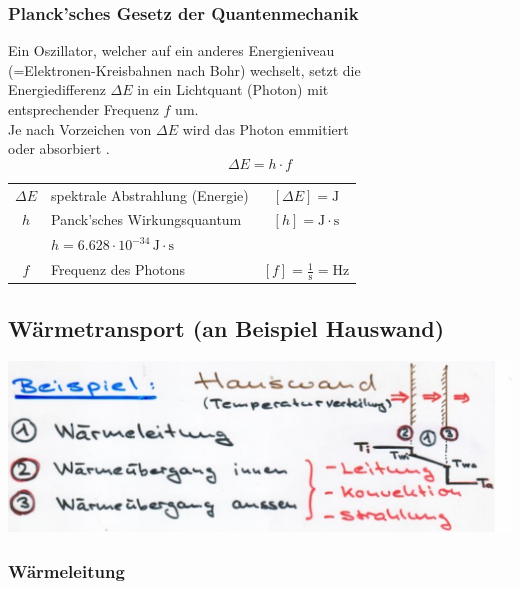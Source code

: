 \subsubsection{Planck'sches Gesetz der Quantenmechanik}

Ein Oszillator, welcher auf ein anderes Energieniveau  \\
(=Elektronen-Kreisbahnen nach Bohr) wechselt, setzt die \\
Energiedifferenz $\Delta E$ in ein Lichtquant (Photon) mit \\
entsprechender Frequenz $f$ um. \\
Je nach Vorzeichen von $\Delta E$ wird das Photon emmitiert  \\
oder absorbiert . \\

$$ \boxed { \Delta E = h \cdot f }  $$

\begin{tabular}{c l c}
	$\Delta E$ & spektrale Abstrahlung (Energie) & $[\Delta E] = \mathrm{J}$ \\
	$h$ & Panck'sches Wirkungsquantum & $[h] = \mathrm{J \cdot s} $\\
	&  $h = 6.628 \cdot 10^{-34} \, \mathrm{J \cdot s}$ &  \\
	\rule{0pt}{8pt}$f$ & Frequenz des Photons & $ [f] = \mathrm{\frac{1}{s} = Hz}$ \\
\end{tabular}



\vfill\null
\columnbreak


\subsection{Wärmetransport (an Beispiel Hauswand)}


\includegraphics[width=0.9\linewidth]{Bilder/Waermetransport} \\


\subsubsection{Wärmeleitung}

